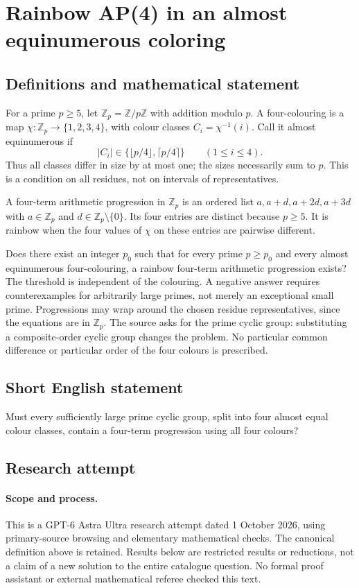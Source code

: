 \documentclass[11pt,a4paper]{article}
\begin{document}
\section*{Rainbow AP(4) in an almost equinumerous coloring}\label{statement}

\subsection{Definitions and mathematical statement}
For a prime $p\ge5$, let $\mathbb Z_p=\mathbb Z/p\mathbb Z$ with addition
modulo $p$. A four-colouring is a map $\chi:\mathbb Z_p\to\{1,2,3,4\}$,
with colour classes $C_i=\chi^{-1}(i)$. Call it almost equinumerous if
\[
 |C_i|\in\{\lfloor p/4\rfloor,\lceil p/4\rceil\}
 \qquad(1\le i\le4).
\]
Thus all classes differ in size by at most one; the sizes necessarily sum
to $p$. This is a condition on all residues, not on intervals of representatives.

A four-term arithmetic progression in $\mathbb Z_p$ is an ordered list
$a,a+d,a+2d,a+3d$ with $a\in\mathbb Z_p$ and
$d\in\mathbb Z_p\setminus\{0\}$. Its four entries are distinct because
$p\ge5$. It is rainbow when the four values of $\chi$ on these entries are
pairwise different.

Does there exist an integer $p_0$ such that for every prime $p\ge p_0$ and
every almost equinumerous four-colouring, a rainbow four-term arithmetic
progression exists? The threshold is independent of the colouring. A
negative answer requires counterexamples for arbitrarily large primes,
not merely an exceptional small prime. Progressions may wrap around the
chosen residue representatives, since the equations are in $\mathbb Z_p$.
The source asks for the prime cyclic group: substituting a composite-order
cyclic group changes the problem. No particular common difference or
particular order of the four colours is prescribed.
\subsection{Short English statement}
Must every sufficiently large prime cyclic group, split into four almost equal colour classes, contain a four-term progression using all four colours?
\subsection{Research attempt}
\paragraph{Scope and process.}
This is a GPT-6 Astra Ultra research attempt dated 1 October 2026, using
primary-source browsing and elementary mathematical checks. The canonical
definition above is retained. Results below are restricted results or
reductions, not a claim of a new solution to the entire catalogue question.
No formal proof assistant or external mathematical referee checked this text.
\end{document}
